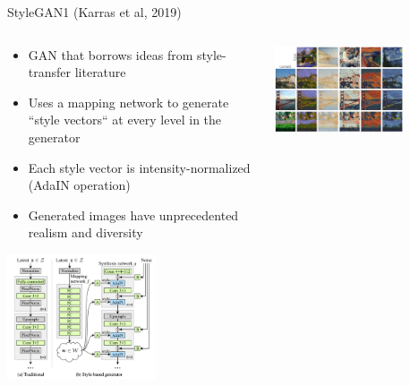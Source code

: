\documentclass[8pt,xcolor=table,aspectratio=169]{beamer}
\begin{document}
\begin{frame}{StyleGAN1 (Karras et al, 2019)}

\begin{columns}
\begin{column}{0.5\textwidth}

\begin{itemize}
 \item GAN that borrows ideas from style-transfer literature 
 
 \vspace{0.5em} 
 
 \item Uses a mapping network to generate ``style vectors`` at every level in the generator

 \vspace{0.5em} 
 
 \item Each style vector is intensity-normalized (AdaIN operation)
 
 \vspace{0.5em}
 
 \item Generated images have unprecedented realism and diversity

\end{itemize}

\begin{center}
\includegraphics[width=0.6\textwidth]{qvLyFbU.png}
\end{center}

\end{column}
\begin{column}{0.5\textwidth}
\centering
\includegraphics[width=0.7\textwidth]{style}


\end{column}
\end{columns}
\end{frame}
\end{document}
